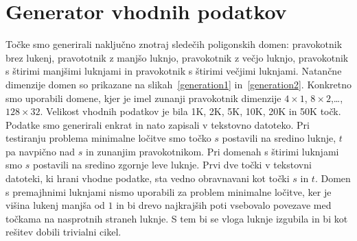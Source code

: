 \documentclass[a4paper, 12pt]{book}
\begin{document}
\section{Generator vhodnih podatkov}

Točke smo generirali naključno znotraj sledečih poligonskih domen: pravokotnik brez lukenj, pravototnik z manjšo luknjo, pravokotnik z večjo luknjo, pravokotnik s štirimi manjšimi luknjami in pravokotnik s štirimi večjimi luknjami. Natančne dimenzije domen so prikazane na slikah~\ref{generation1} in~\ref{generation2}. Konkretno smo uporabili domene, kjer je imel zunanji pravokotnik dimenzije $4\times 1$, $8\times 2$,\ldots, $128\times 32$. Velikost vhodnih podatkov je bila 1K, 2K, 5K, 10K, 20K in 50K točk. Podatke smo generirali enkrat in nato zapisali v tekstovno datoteko. Pri testiranju problema minimalne ločitve smo točko $s$ postavili na sredino luknje, $t$ pa navpično nad $s$ in zunanjim pravokotnikom. Pri domenah s štirimi luknjami smo $s$ postavili na sredino zgornje leve luknje. Prvi dve točki v tekstovni datoteki, ki hrani vhodne podatke, sta vedno obravnavani kot točki $s$ in $t$. Domen s premajhnimi luknjami nismo uporabili za problem minimalne ločitve, ker je višina lukenj manjša od $1$ in bi drevo najkrajših poti vsebovalo povezave med točkama na nasprotnih straneh luknje. S tem bi se vloga luknje izgubila in bi kot rešitev dobili trivialni cikel.
\end{document}
